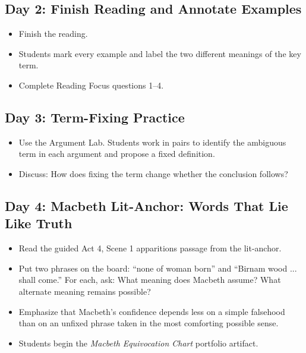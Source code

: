 \documentclass[12pt]{article}
\begin{document}
\subsection*{Day 2: Finish Reading and Annotate Examples}
\begin{itemize}[leftmargin=*]
\item Finish the reading.
\item Students mark every example and label the two different meanings of the key term.
\item Complete Reading Focus questions 1–4.
\end{itemize}

\subsection*{Day 3: Term-Fixing Practice}
\begin{itemize}[leftmargin=*]
\item Use the Argument Lab. Students work in pairs to identify the ambiguous term in each argument and propose a fixed definition.
\item Discuss: How does fixing the term change whether the conclusion follows?
\end{itemize}

\subsection*{Day 4: Macbeth Lit-Anchor: Words That Lie Like Truth}
\begin{itemize}[leftmargin=*]
\item Read the guided Act 4, Scene 1 apparitions passage from the lit-anchor.
\item Put two phrases on the board: ``none of woman born'' and ``Birnam wood ... shall come.'' For each, ask: What meaning does Macbeth assume? What alternate meaning remains possible?
\item Emphasize that Macbeth's confidence depends less on a simple falsehood than on an unfixed phrase taken in the most comforting possible sense.
\item Students begin the \textit{Macbeth Equivocation Chart} portfolio artifact.
\end{itemize}
\end{document}
